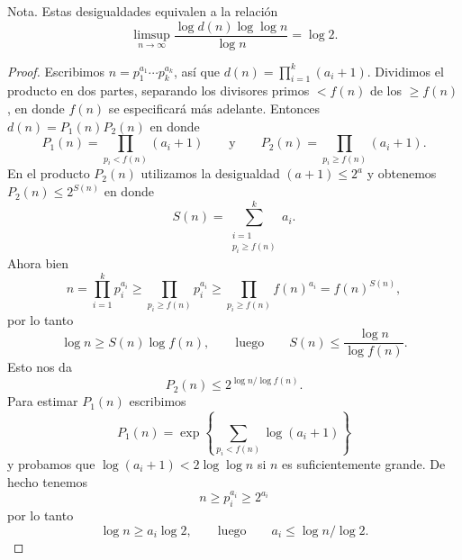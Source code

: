     Nota. Estas desigualdades equivalen a la relación
    \begin{equation*}
        \limsup_{n\to\infty}\frac{\log d(n)\log\log n}{\log n}=\log2.
    \end{equation*}

    \begin{proof}
        Escribimos $n=p_1^{a_1}\cdots p_k^{a_k}$, así que $d(n)=\prod_{i=1}^{k}(a_i+1)$.
        Dividimos el producto en dos partes, separando los divisores primos $<f(n)$ de los
        $\geq f(n)$, en donde $f(n)$ se especificará más adelante. Entonces
        $d(n)=P_1(n)P_2(n)$ en donde
        \begin{equation*}
            P_1(n)=\prod_{p_i<f(n)}(a_i+1)\qquad\text{y}\qquad P_2(n)=\prod_{p_i\geq f(n)}(a_i+1).
        \end{equation*}
        En el producto $P_2(n)$ utilizamos la desigualdad $(a+1)\leq2^a$ y obtenemos
        $P_2(n)\leq2^{S(n)}$ en donde
        \begin{equation*}
            S(n)=\sum_{\substack{i=1\\p_i\geq f(n)}}^{k}a_i.
        \end{equation*}
        Ahora bien
        \begin{equation*}
            n=\prod_{i=1}^{k}p_i^{a_i}\geq\prod_{p_i\geq f(n)}p_i^{a_i}\geq\prod_{p_i\geq f(n)}f(n)^{a_i}=f(n)^{S(n)},
        \end{equation*}
        por lo tanto
        \begin{equation*}
            \log n\geq S(n)\log f(n),\qquad\text{luego}\qquad S(n)\leq\frac{\log n}{\log f(n)}.
        \end{equation*}
        Esto nos da
        \begin{equation}\label{eq:13-29}
            P_2(n)\leq2^{\log n/\log f(n)}.
        \end{equation}
        Para estimar $P_1(n)$ escribimos
        \begin{equation*}
            P_1(n)=\exp\left\{\sum_{p_i<f(n)}\log(a_i+1)\right\}
        \end{equation*}
        y probamos que $\log(a_i+1)<2\log\log n$ si $n$ es suficientemente grande. De hecho
        tenemos
        \begin{equation*}
            n\geq p_i^{a_i}\geq2^{a_i}
        \end{equation*}
        por lo tanto
        \begin{equation*}
            \log n\geq a_i\log2,\qquad\text{luego}\qquad a_i\leq\log n/\log2.

\end{equation*}
\end{proof}
